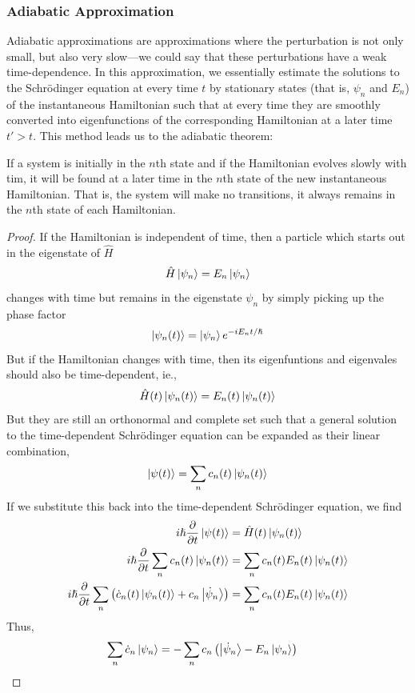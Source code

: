 \documentclass[a4paper]{article}
\begin{document}
\subsubsection{Adiabatic Approximation}
Adiabatic approximations are approximations where the perturbation is not only
small, but also very slow---we could say that these perturbations have a weak
time-dependence. In this approximation, we essentially estimate the solutions
to the Schr\"odinger equation at every time $t$ by stationary states
(that is, $\psi_n$ and $E_n$) of the instantaneous Hamiltonian such that at
every time they are smoothly converted into eigenfunctions of the
corresponding Hamiltonian at a later time $t'>t$. This method leads us to the
adiabatic theorem:
\begin{thm}
	If a system is initially in the $n$th state and if the Hamiltonian
	evolves slowly with tim, it will be found at a later time in the
	$n$th state of the new instantaneous Hamiltonian. That is, the
	system will make no transitions, it always remains in the $n$th state
	of each Hamiltonian.
\begin{proof}
	If the Hamiltonian is independent of time, then a particle which starts
	out in the eigenstate of $\hat{H}$
		\[ \hat{H}\left\lvert \psi_n\right\rangle = E_n\left\lvert \psi_n\right\rangle \]
	changes with time but remains in the eigenstate $\psi_n$ by simply
	picking up the phase factor
		\[ \left\lvert \psi_n(t)\right\rangle = \left\lvert \psi_n\right\rangle e^{-i E_n t/\hslash} \]
	But if the Hamiltonian changes with time, then its eigenfuntions and
	eigenvales should also be time-dependent, ie.,
		\[ \hat{H}(t)\left\lvert \psi_n(t)\right\rangle = E_n(t)\left\lvert \psi_n(t)\right\rangle \]
	But they are still an orthonormal and complete set such that a general
	solution to the time-dependent Schr\"odinger equation can be
	expanded as their linear combination,
		\[ \left\lvert \psi(t)\right\rangle = \sum_n c_n(t)\left\lvert \psi_n(t)\right\rangle \]
	If we substitute this back into the time-dependent Schr\"odinger
	equation, we find
	\begin{align*}
		i\hslash\pd{t}\bket{\psi(t)} &= \hat{H}(t)\bket{\psi_n(t)}\\
		i\hslash\pd{t}\sum_nc_n(t)\bket{\psi_n(t)} &= \sum_nc_n(t)
			E_n(t)\bket{\psi_n(t)}\\
		i\hslash\pd{t}\sum_n\left(\dot{c}_n(t)\bket{\psi_n(t)}
			+c_n\bket{\dot{\psi}_n}\right)
			&= \sum_nc_n(t)	E_n(t)\bket{\psi_n(t)}
	\end{align*}
	Thus,
	\begin{align*}
		\sum_n\dot{c}_n\bket{\psi_n} &= -\sum_nc_n\left(
		\bket{\dot{\psi}_n} - E_n\bket{\psi_n}\right)

\end{align*}
\end{proof}
\end{thm}
\end{document}
